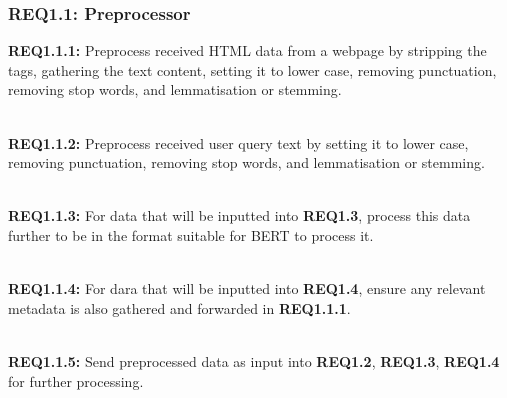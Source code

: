 \subsubsection{REQ1.1: Preprocessor}

\textbf{REQ1.1.1:} Preprocess received HTML data from a webpage by stripping the tags, gathering the text content, setting it to lower case, removing punctuation, removing stop words, and lemmatisation or stemming.\par

\textbf{\\REQ1.1.2:} Preprocess received user query text by setting it to lower case, removing punctuation, removing stop words, and lemmatisation or stemming.\par

\textbf{\\REQ1.1.3:} For data that will be inputted into \textbf{REQ1.3}, process this data further to be in the format suitable for BERT to process it.\par

\textbf{\\REQ1.1.4:} For dara that will be inputted into \textbf{REQ1.4}, ensure any relevant metadata is also gathered and forwarded in \textbf{REQ1.1.1}.\par

\textbf{\\REQ1.1.5:} Send preprocessed data as input into \textbf{REQ1.2}, \textbf{REQ1.3}, \textbf{REQ1.4} for further processing.\par
